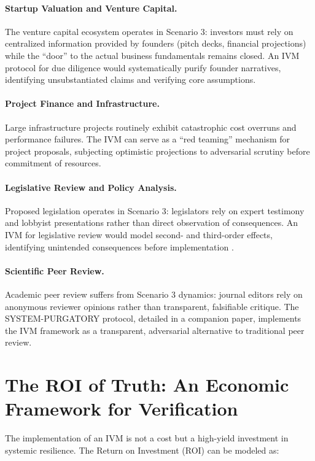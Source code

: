 \documentclass[11pt,a4paper]{article}
\begin{document}
\begin{small}
\paragraph{Startup Valuation and Venture Capital.} The venture capital ecosystem operates in Scenario 3: investors must rely on centralized information provided by founders (pitch decks, financial projections) while the ``door'' to the actual business fundamentals remains closed. An IVM protocol for due diligence would systematically purify founder narratives, identifying unsubstantiated claims and verifying core assumptions.

\paragraph{Project Finance and Infrastructure.} Large infrastructure projects routinely exhibit catastrophic cost overruns and performance failures. The IVM can serve as a ``red teaming'' mechanism for project proposals, subjecting optimistic projections to adversarial scrutiny before commitment of resources.

\paragraph{Legislative Review and Policy Analysis.} Proposed legislation operates in Scenario 3: legislators rely on expert testimony and lobbyist presentations rather than direct observation of consequences. An IVM for legislative review would model second- and third-order effects, identifying unintended consequences before implementation \citep{Kovnatsky2025SVE5}.

\paragraph{Scientific Peer Review.} Academic peer review suffers from Scenario 3 dynamics: journal editors rely on anonymous reviewer opinions rather than transparent, falsifiable critique. The SYSTEM-PURGATORY protocol, detailed in a companion paper, implements the IVM framework as a transparent, adversarial alternative to traditional peer review.

\section{The ROI of Truth: An Economic Framework for Verification}

The implementation of an IVM is not a cost but a high-yield investment in systemic resilience. The Return on Investment (ROI) can be modeled as:


\end{small}
\end{document}
